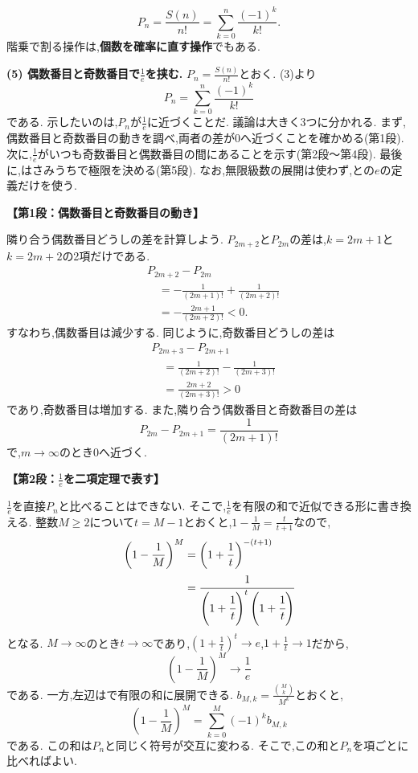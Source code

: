 \begin{enumerate}[label=\textbf{問\arabic*.},leftmargin=3.8em,format=\bookitemlink{practice-entrance}{solution}{problem}]
    \[
      P_n=\frac{S(n)}{n!}=\sum_{k=0}^n\frac{(-1)^k}{k!}.
    \]
    階乗で割る操作は,\textbf{個数を確率に直す操作}でもある.
    \par\smallskip\textbf{(5) 偶数番目と奇数番目で$\frac1e$を挟む.}
    $P_n=\frac{S(n)}{n!}$とおく.
    (3)より
    \[
      P_n=\sum_{k=0}^{n}\frac{(-1)^k}{k!}
    \]
    である.
    示したいのは,$P_n$が$\frac1e$に近づくことだ.
    議論は大きく3つに分かれる.
    まず,偶数番目と奇数番目の動きを調べ,両者の差が0へ近づくことを確かめる(第1段).
    次に,$\frac1e$がいつも奇数番目と偶数番目の間にあることを示す(第2段〜第4段).
    最後に,はさみうちで極限を決める(第5段).
    なお,無限級数の展開は使わず,との$e$の定義だけを使う.

    \par\smallskip\noindent\textbf{【第1段：偶数番目と奇数番目の動き】}\par\nopagebreak[4]
    隣り合う偶数番目どうしの差を計算しよう.
    $P_{2m+2}$と$P_{2m}$の差は,$k=2m+1$と$k=2m+2$の2項だけである.
    \begin{align*}
      &P_{2m+2}-P_{2m}\\
      &\quad=-\frac1{(2m+1)!}+\frac1{(2m+2)!}\\
      &\quad=-\frac{2m+1}{(2m+2)!}<0.
    \end{align*}
    すなわち,偶数番目は減少する.
    同じように,奇数番目どうしの差は
    \begin{align*}
      &P_{2m+3}-P_{2m+1}\\
      &\quad=\frac1{(2m+2)!}-\frac1{(2m+3)!}\\
      &\quad=\frac{2m+2}{(2m+3)!}>0
    \end{align*}
    であり,奇数番目は増加する.
    また,隣り合う偶数番目と奇数番目の差は
    \[
      P_{2m}-P_{2m+1}=\frac1{(2m+1)!}
    \]
    で,$m\to\infty$のとき0へ近づく.

    \par\smallskip\noindent\textbf{【第2段：$\frac1e$を二項定理で表す】}\par\nopagebreak[4]
    $\frac1e$を直接$P_n$と比べることはできない.
    そこで,$\frac1e$を有限の和で近似できる形に書き換える.
    整数$M\ge2$について$t=M-1$とおくと,$1-\frac1M=\frac{t}{t+1}$なので,
    \begin{align*}
      \left(1-\frac1M\right)^M
      &=\left(1+\frac1t\right)^{-(t+1)}\\
      &=\cfrac{1}{\left(1+\cfrac1t\right)^t\left(1+\cfrac1t\right)}
    \end{align*}
    となる.
    $M\to\infty$のとき$t\to\infty$であり,$\left(1+\frac1t\right)^t\to e$,$1+\frac1t\to1$だから,
    \[
      \left(1-\frac1M\right)^M\longrightarrow\frac1e
    \]
    である.
    一方,左辺はで有限の和に展開できる.
    $b_{M,k}=\frac{\binom Mk}{M^k}$とおくと,
    \[
      \left(1-\frac1M\right)^M=\sum_{k=0}^{M}(-1)^kb_{M,k}
    \]
    である.
    この和は$P_n$と同じく符号が交互に変わる.
    そこで,この和と$P_n$を項ごとに比べればよい.


\end{enumerate}

